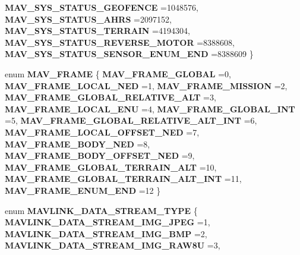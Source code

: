 \begin{DoxyCompactItemize}
\newline
\textbf{ M\+A\+V\+\_\+\+S\+Y\+S\+\_\+\+S\+T\+A\+T\+U\+S\+\_\+\+G\+E\+O\+F\+E\+N\+CE} =1048576, 
\textbf{ M\+A\+V\+\_\+\+S\+Y\+S\+\_\+\+S\+T\+A\+T\+U\+S\+\_\+\+A\+H\+RS} =2097152, 
\textbf{ M\+A\+V\+\_\+\+S\+Y\+S\+\_\+\+S\+T\+A\+T\+U\+S\+\_\+\+T\+E\+R\+R\+A\+IN} =4194304, 
\textbf{ M\+A\+V\+\_\+\+S\+Y\+S\+\_\+\+S\+T\+A\+T\+U\+S\+\_\+\+R\+E\+V\+E\+R\+S\+E\+\_\+\+M\+O\+T\+OR} =8388608, 
\newline
\textbf{ M\+A\+V\+\_\+\+S\+Y\+S\+\_\+\+S\+T\+A\+T\+U\+S\+\_\+\+S\+E\+N\+S\+O\+R\+\_\+\+E\+N\+U\+M\+\_\+\+E\+ND} =8388609
 \}
\item 
enum \textbf{ M\+A\+V\+\_\+\+F\+R\+A\+ME} \{ \newline
\textbf{ M\+A\+V\+\_\+\+F\+R\+A\+M\+E\+\_\+\+G\+L\+O\+B\+AL} =0, 
\textbf{ M\+A\+V\+\_\+\+F\+R\+A\+M\+E\+\_\+\+L\+O\+C\+A\+L\+\_\+\+N\+ED} =1, 
\textbf{ M\+A\+V\+\_\+\+F\+R\+A\+M\+E\+\_\+\+M\+I\+S\+S\+I\+ON} =2, 
\textbf{ M\+A\+V\+\_\+\+F\+R\+A\+M\+E\+\_\+\+G\+L\+O\+B\+A\+L\+\_\+\+R\+E\+L\+A\+T\+I\+V\+E\+\_\+\+A\+LT} =3, 
\newline
\textbf{ M\+A\+V\+\_\+\+F\+R\+A\+M\+E\+\_\+\+L\+O\+C\+A\+L\+\_\+\+E\+NU} =4, 
\textbf{ M\+A\+V\+\_\+\+F\+R\+A\+M\+E\+\_\+\+G\+L\+O\+B\+A\+L\+\_\+\+I\+NT} =5, 
\textbf{ M\+A\+V\+\_\+\+F\+R\+A\+M\+E\+\_\+\+G\+L\+O\+B\+A\+L\+\_\+\+R\+E\+L\+A\+T\+I\+V\+E\+\_\+\+A\+L\+T\+\_\+\+I\+NT} =6, 
\textbf{ M\+A\+V\+\_\+\+F\+R\+A\+M\+E\+\_\+\+L\+O\+C\+A\+L\+\_\+\+O\+F\+F\+S\+E\+T\+\_\+\+N\+ED} =7, 
\newline
\textbf{ M\+A\+V\+\_\+\+F\+R\+A\+M\+E\+\_\+\+B\+O\+D\+Y\+\_\+\+N\+ED} =8, 
\textbf{ M\+A\+V\+\_\+\+F\+R\+A\+M\+E\+\_\+\+B\+O\+D\+Y\+\_\+\+O\+F\+F\+S\+E\+T\+\_\+\+N\+ED} =9, 
\textbf{ M\+A\+V\+\_\+\+F\+R\+A\+M\+E\+\_\+\+G\+L\+O\+B\+A\+L\+\_\+\+T\+E\+R\+R\+A\+I\+N\+\_\+\+A\+LT} =10, 
\textbf{ M\+A\+V\+\_\+\+F\+R\+A\+M\+E\+\_\+\+G\+L\+O\+B\+A\+L\+\_\+\+T\+E\+R\+R\+A\+I\+N\+\_\+\+A\+L\+T\+\_\+\+I\+NT} =11, 
\newline
\textbf{ M\+A\+V\+\_\+\+F\+R\+A\+M\+E\+\_\+\+E\+N\+U\+M\+\_\+\+E\+ND} =12
 \}
\item 
enum \textbf{ M\+A\+V\+L\+I\+N\+K\+\_\+\+D\+A\+T\+A\+\_\+\+S\+T\+R\+E\+A\+M\+\_\+\+T\+Y\+PE} \{ \newline
\textbf{ M\+A\+V\+L\+I\+N\+K\+\_\+\+D\+A\+T\+A\+\_\+\+S\+T\+R\+E\+A\+M\+\_\+\+I\+M\+G\+\_\+\+J\+P\+EG} =1, 
\textbf{ M\+A\+V\+L\+I\+N\+K\+\_\+\+D\+A\+T\+A\+\_\+\+S\+T\+R\+E\+A\+M\+\_\+\+I\+M\+G\+\_\+\+B\+MP} =2, 
\textbf{ M\+A\+V\+L\+I\+N\+K\+\_\+\+D\+A\+T\+A\+\_\+\+S\+T\+R\+E\+A\+M\+\_\+\+I\+M\+G\+\_\+\+R\+A\+W8U} =3, 

\end{DoxyCompactItemize}
